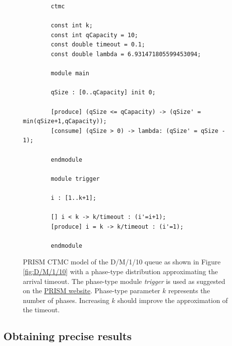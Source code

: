 \documentclass[runningheads,custombib]{llncs}
\begin{document}
	\begin{figure}[H]
		\begin{lstlisting}
		ctmc
		
		const int k;
		const int qCapacity = 10;
		const double timeout = 0.1;
		const double lambda = 6.931471805599453094;
		
		module main
		
		qSize : [0..qCapacity] init 0;
		
		[produce] (qSize <= qCapacity) -> (qSize' = min(qSize+1,qCapacity));
		[consume] (qSize > 0) -> lambda: (qSize' = qSize - 1);
		
		endmodule
		
		module trigger
		
		i : [1..k+1];
		
		[] i < k -> k/timeout : (i'=i+1);
		[produce] i = k -> k/timeout : (i'=1);
		
		endmodule
		\end{lstlisting}
		\caption{PRISM CTMC model of the D/M/1/10 queue as shown in Figure \ref{fig:D/M/1/10} with a phase-type distribution approximating the arrival timeout. The phase-type module \emph{trigger} is used as suggested on the \href{http://www.prismmodelchecker.org/manual/FrequentlyAskedQuestions/PRISMModelling}{PRISM website}. Phase-type parameter $k$ represents the number of phases. Increasing $k$ should improve the approximation of the timeout. }
		\label{fig:D/M/1/10_PRISM}
	\end{figure}
	
	\subsection{Obtaining precise results}
	\label{reference}
	
	
	
	
\end{document}
